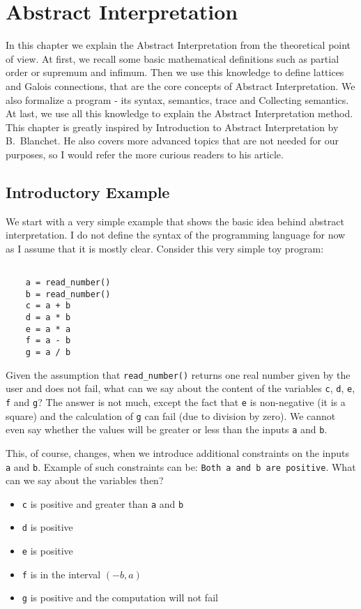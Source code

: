 \chapter{Abstract Interpretation}

In this chapter we explain the Abstract Interpretation from the theoretical point of view.
At first, we recall some basic mathematical definitions such as partial order or supremum and infimum.
Then we use this knowledge to define lattices and Galois connections, that are the core concepts of Abstract
Interpretation.
We also formalize a program - its syntax, semantics, trace and Collecting semantics.
At last, we use all this knowledge to explain the Abstract Interpretation method.
This chapter is greatly inspired by Introduction to Abstract Interpretation by B.~Blanchet\cite{Blanchet:2002:AI}.
He also covers more advanced topics that are not needed for our purposes, so I would refer the more curious readers
to his article.


\section{Introductory Example} %

We start with a very simple example that shows the basic idea behind abstract interpretation.
I do not define the syntax of the programming language for now as I assume that it is mostly clear.
Consider this very simple toy program:

\begin{verbatim}

    a = read_number()
    b = read_number()
    c = a + b
    d = a * b
    e = a * a
    f = a - b
    g = a / b

\end{verbatim}

Given the assumption that \verb|read_number()| returns one real number given by the user and does not fail, what can
we say about the content of the variables \verb|c|, \verb|d|, \verb|e|, \verb|f| and \verb|g|?
The answer is not much, except the fact that \verb|e| is non-negative (it is a square) and the calculation of \verb|g|
can fail (due to division by zero).
We cannot even say whether the values will be greater or less than the inputs \verb|a| and \verb|b|.

This, of course, changes, when we introduce additional constraints on the inputs \verb|a| and \verb|b|.
Example of such constraints can be: \verb|Both a and b are positive|.
What can we say about the variables then?
\begin{itemize}
    \item \verb|c| is positive and greater than \verb|a| and \verb|b|
    \item \verb|d| is positive
    \item \verb|e| is positive
    \item \verb|f| is in the interval $(-b, a)$
    \item \verb|g| is positive and the computation will not fail
\end{itemize}

